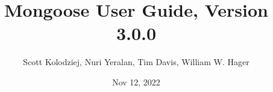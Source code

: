 \title{Mongoose User Guide, Version 3.0.0}
\author{Scott Kolodziej, Nuri Yeralan, Tim Davis, William W. Hager}
\date{Nov 12, 2022}
